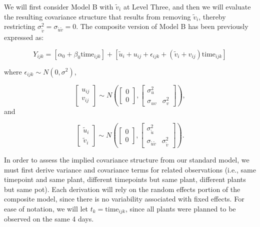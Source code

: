 \documentclass[
]{krantz}
\begin{document}
We will first consider Model B with \(\tilde{v}_{i}\) at Level Three, and then we will evaluate the resulting covariance structure that results from removing \(\tilde{v}_{i}\), thereby restricting \(\sigma_{\tilde{v}}^{2}=\sigma_{\tilde{u}\tilde{v}}=0\). The composite version of Model B has been previously expressed as:

\begin{equation*}
Y_{ijk}=[\alpha_{0}+\beta_{0}\textrm{time}_{ijk}]+
[\tilde{u}_{i}+u_{ij}+\epsilon_{ijk}+(\tilde{v}_{i}+v_{ij})\textrm{time}_{ijk}]
\end{equation*}

where \(\epsilon_{ijk}\sim N(0,\sigma^2)\),

\[ \left[ \begin{array}{c}
            u_{ij} \\ v_{ij}
          \end{array}  \right] \sim N \left( \left[
          \begin{array}{c}
            0 \\ 0
          \end{array} \right], \left[
          \begin{array}{cc}
            \sigma_{u}^{2} & \\
            \sigma_{uv} & \sigma_{v}^{2}
          \end{array} \right] \right), \] and

\[ \left[ \begin{array}{c}
            \tilde{u}_{i} \\ \tilde{v}_{i}
          \end{array}  \right] \sim N \left( \left[
          \begin{array}{c}
            0 \\ 0
          \end{array} \right], \left[
          \begin{array}{cc}
            \sigma_{\tilde{u}}^{2} & \\
            \sigma_{\tilde{u}\tilde{v}} & \sigma_{\tilde{v}}^{2}
          \end{array} \right] \right). \]

In order to assess the implied covariance structure from our standard model, we must first derive variance and covariance terms for related observations (i.e., same timepoint and same plant, different timepoints but same plant, different plants but same pot). Each derivation will rely on the random effects portion of the composite model, since there is no variability associated with fixed effects. For ease of notation, we will let \(t_{k}=\textrm{time}_{ijk}\), since all plants were planned to be observed on the same 4 days.
\end{document}
